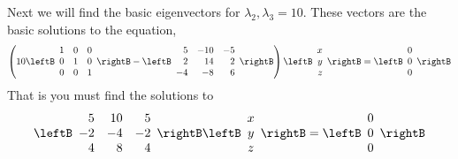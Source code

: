 \begin{solution}
Next we will find the basic eigenvectors for $\lambda_2, \lambda_3=10.$ These vectors are the basic 
solutions to the equation,
\begin{equation*}
\left( 10\leftB
\begin{array}{rrr}
1 & 0 & 0 \\
0 & 1 & 0 \\
0 & 0 & 1
\end{array}
\rightB - \leftB
\begin{array}{rrr}
5 & -10 & -5 \\
2 & 14 & 2 \\
-4 & -8 & 6
\end{array}
\rightB  \right) \leftB
\begin{array}{r}
x \\
y \\
z
\end{array}
\rightB =\leftB
\begin{array}{r}
0 \\
0 \\
0
\end{array}
\rightB
\end{equation*}
That is you must find the solutions to
\begin{equation*}
\leftB
\begin{array}{rrr}
5 & 10 & 5 \\
 -2 &  -4  & -2 \\
4 & 8  & 4
\end{array}
\rightB \leftB
\begin{array}{c}
x \\
y \\
z
\end{array}
\rightB =\leftB
\begin{array}{r}
0 \\
0 \\
0
\end{array}
\rightB
\end{equation*}


\end{solution}
